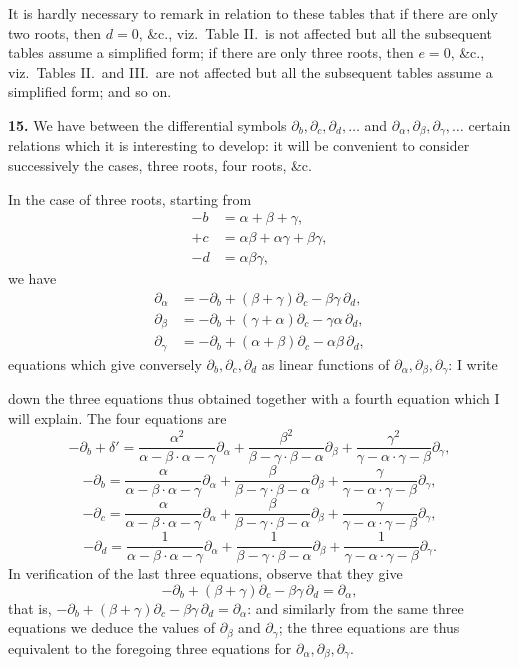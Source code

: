 \documentclass[11pt]{article}
\begin{document}
It is hardly necessary to remark in relation to these tables that if there are only two roots, then $d = 0$, \&c., viz.\ Table II.\ is not affected but all the subsequent tables assume a simplified form; if there are only three roots, then $e = 0$, \&c., viz.\ Tables II.\ and III.\ are not affected but all the subsequent tables assume a simplified form; and so on.

\textbf{15.} We have between the differential symbols $\partial_b, \partial_c, \partial_d, \ldots$ and $\partial_\alpha, \partial_\beta, \partial_\gamma, \ldots$ certain relations which it is interesting to develop: it will be convenient to consider successively the cases, three roots, four roots, \&c.

In the case of three roots, starting from
\begin{align*}
-b &= \alpha + \beta + \gamma,\\
+c &= \alpha\beta + \alpha\gamma + \beta\gamma,\\
-d &= \alpha\beta\gamma,
\end{align*}
we have
\begin{align*}
\partial_\alpha &= -\partial_b + (\beta + \gamma)\partial_c - \beta\gamma\,\partial_d,\\
\partial_\beta &= -\partial_b + (\gamma + \alpha)\partial_c - \gamma\alpha\,\partial_d,\\
\partial_\gamma &= -\partial_b + (\alpha + \beta)\partial_c - \alpha\beta\,\partial_d,
\end{align*}
equations which give conversely $\partial_b, \partial_c, \partial_d$ as linear functions of $\partial_\alpha, \partial_\beta, \partial_\gamma$: I write

down the three equations thus obtained together with a fourth equation which I will explain. The four equations are
\[
-\partial_b + \delta' = \frac{\alpha^2}{\alpha-\beta\cdot\alpha-\gamma}\partial_\alpha + \frac{\beta^2}{\beta-\gamma\cdot\beta-\alpha}\partial_\beta + \frac{\gamma^2}{\gamma-\alpha\cdot\gamma-\beta}\partial_\gamma,
\]
\[
-\partial_b = \frac{\alpha}{\alpha-\beta\cdot\alpha-\gamma}\partial_\alpha + \frac{\beta}{\beta-\gamma\cdot\beta-\alpha}\partial_\beta + \frac{\gamma}{\gamma-\alpha\cdot\gamma-\beta}\partial_\gamma,
\]
\[
-\partial_c = \frac{\alpha}{\alpha-\beta\cdot\alpha-\gamma}\partial_\alpha + \frac{\beta}{\beta-\gamma\cdot\beta-\alpha}\partial_\beta + \frac{\gamma}{\gamma-\alpha\cdot\gamma-\beta}\partial_\gamma,
\]
\[
-\partial_d = \frac{1}{\alpha-\beta\cdot\alpha-\gamma}\partial_\alpha + \frac{1}{\beta-\gamma\cdot\beta-\alpha}\partial_\beta + \frac{1}{\gamma-\alpha\cdot\gamma-\beta}\partial_\gamma.
\]
In verification of the last three equations, observe that they give
\[
-\partial_b + (\beta + \gamma)\partial_c - \beta\gamma\,\partial_d = \partial_\alpha,
\]
that is, $-\partial_b + (\beta + \gamma)\partial_c - \beta\gamma\,\partial_d = \partial_\alpha$: and similarly from the same three equations we deduce the values of $\partial_\beta$ and $\partial_\gamma$; the three equations are thus equivalent to the foregoing three equations for $\partial_\alpha, \partial_\beta, \partial_\gamma$.
\end{document}
